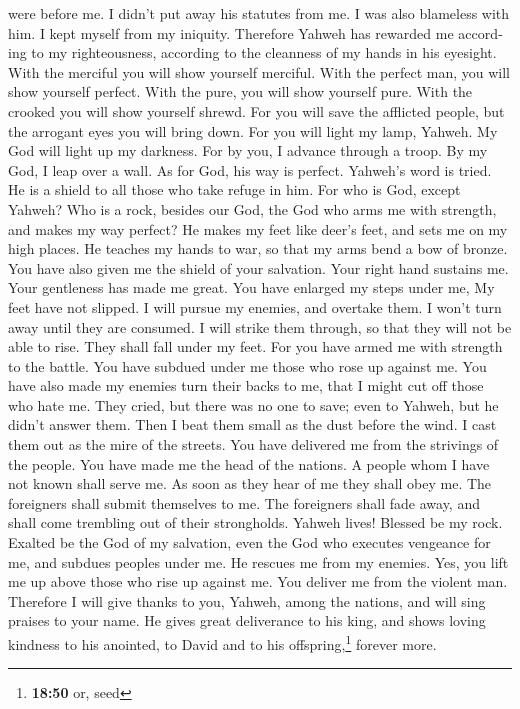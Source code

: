 \begin{paracol}{2}
\begin{otherlanguage}{english}
were before me. I didn't put away his statutes from me. 
I was also blameless with him. I kept myself from my iniquity.
 Therefore Yahweh has rewarded me according to my
righteousness, according to the cleanness of my hands in his eyesight.
 With the merciful you will show yourself merciful. With
the perfect man, you will show yourself perfect.  With
the pure, you will show yourself pure. With the crooked you will show
yourself shrewd.  For you will save the afflicted people,
but the arrogant eyes you will bring down.  For you will
light my lamp, Yahweh. My God will light up my darkness. 
For by you, I advance through a troop. By my God, I leap over a wall.
 As for God, his way is perfect. Yahweh's word is tried.
He is a shield to all those who take refuge in him.  For
who is God, except Yahweh? Who is a rock, besides our God,
 the God who arms me with strength, and makes my way
perfect?  He makes my feet like deer's feet, and sets me
on my high places.  He teaches my hands to war, so that
my arms bend a bow of bronze.  You have also given me the
shield of your salvation. Your right hand sustains me. Your gentleness
has made me great.  You have enlarged my steps under me,
My feet have not slipped.  I will pursue my enemies, and
overtake them. I won't turn away until they are consumed.
 I will strike them through, so that they will not be
able to rise. They shall fall under my feet.  For you
have armed me with strength to the battle. You have subdued under me
those who rose up against me.  You have also made my
enemies turn their backs to me, that I might cut off those who hate me.
 They cried, but there was no one to save; even to
Yahweh, but he didn't answer them.  Then I beat them
small as the dust before the wind. I cast them out as the mire of the
streets.  You have delivered me from the strivings of the
people. You have made me the head of the nations. A people whom I have
not known shall serve me.  As soon as they hear of me
they shall obey me. The foreigners shall submit themselves to me.
 The foreigners shall fade away, and shall come trembling
out of their strongholds.  Yahweh lives! Blessed be my
rock. Exalted be the God of my salvation,  even the God
who executes vengeance for me, and subdues peoples under me.
 He rescues me from my enemies. Yes, you lift me up above
those who rise up against me. You deliver me from the violent man.
 Therefore I will give thanks to you, Yahweh, among the
nations, and will sing praises to your name.  He gives
great deliverance to his king, and shows loving kindness to his
anointed, to David and to his offspring,\footnote{\textbf{18:50} or,
  seed} forever more.


\end{otherlanguage}
\end{paracol}

